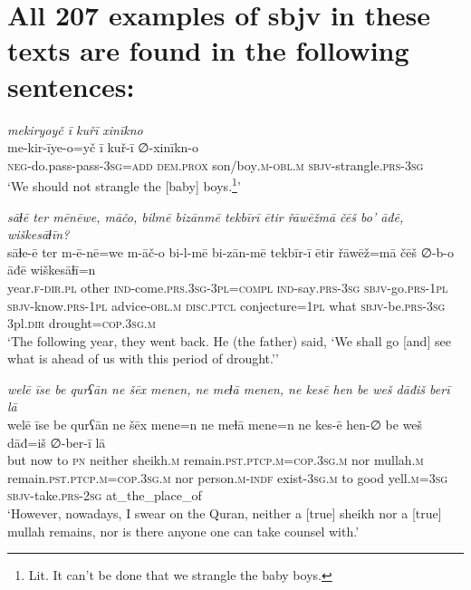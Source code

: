 \chapter{All 207 examples of sbjv in these texts are found in the following sentences:}

\ea \label{ZB.35}
\textit{mekiryoyč ī kuřī xinīkno} \\ 
\gll me-kir-īye-o=yč ī kuř-ī ∅-xinīkn-o \\ 
 \textsc{neg-}do.pass-pass\textsc{-3sg}\textsc{=add} \textsc{dem.prox} son/boy\textsc{.m}\textsc{-obl}\textsc{.m} \textsc{sbjv}-strangle\textsc{.prs}\textsc{-3sg} \\ 
\glt `We should not strangle the [baby] boys.\footnote{Lit. It can't be done that we strangle the baby boys.}'
\z 
 
\ea \label{ZB.46}
\textit{sāɫē ter mēnēwe, māčo, bilmē bizānmē tekbīrī ētir řāwēžmā čēš bo’ āđē, wiškesāɫīn?} \\ 
\gll sāɫe-ē ter m-ē-nē=we m-āč-o bi-l-mē bi-zān-mē tekbīr-ī ētir řāwēž=mā čēš ∅-b-o āđē wiškesāɫī=n \\ 
 year\textsc{.f}\textsc{-dir}\textsc{.pl} other \textsc{ind-}come\textsc{.prs}\textsc{.3sg}\textsc{-3pl}\textsc{=compl} \textsc{ind-}say\textsc{.prs}\textsc{-3sg} \textsc{sbjv-}go\textsc{.prs}\textsc{-1pl} \textsc{sbjv-}know\textsc{.prs}\textsc{-1pl} advice\textsc{-obl}\textsc{.m} \textsc{disc.ptcl} conjecture\textsc{=1pl} what \textsc{sbjv-}be\textsc{.prs}\textsc{-3sg} 3pl\textsc{.dir} drought\textsc{=cop}\textsc{.3sg}\textsc{.m} \\ 
\glt `The following year, they went back. He (the father) said, ‘We shall go [and] see what is ahead of us with this period of drought.’'
\z 
 
\ea \label{ZB.60}
\textit{welē īse be qurʕān ne šēx menen, ne meɫā menen, ne kesē hen be weš dāđiš berī lā} \\ 
\gll welē īse be qurʕān ne šēx mene=n ne meɫā mene=n ne kes-ē hen-∅ be weš dāđ=iš ∅-ber-ī lā \\ 
 but now to \textsc{pn} neither sheikh\textsc{.m} remain\textsc{.pst}\textsc{.ptcp}\textsc{.m}\textsc{=cop}\textsc{.3sg}\textsc{.m} nor mullah\textsc{.m} remain\textsc{.pst}\textsc{.ptcp}\textsc{.m}\textsc{=cop}\textsc{.3sg}\textsc{.m} nor person\textsc{.m}\textsc{-indf} exist\textsc{-3sg}\textsc{.m} to good yell\textsc{.m}\textsc{=3sg} \textsc{sbjv-}take\textsc{.prs}-\textsc{2sg} at\_the\_place\_of \\ 
\glt `However, nowadays, I swear on the Quran, neither a [true] sheikh nor a [true] mullah remains, nor is there anyone one can take counsel with.'
\z 
 
